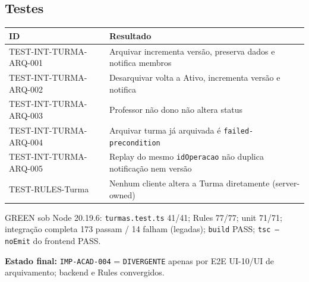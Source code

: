 \subsection{Testes}

\small
\begin{longtable}{@{}p{}p{}@{}}
\toprule
ID & Resultado \\
\midrule
\endhead
TEST-INT-TURMA-ARQ-001 & Arquivar incrementa versão, preserva dados e notifica membros \\
TEST-INT-TURMA-ARQ-002 & Desarquivar volta a Ativo, incrementa versão e notifica \\
TEST-INT-TURMA-ARQ-003 & Professor não dono não altera status \\
TEST-INT-TURMA-ARQ-004 & Arquivar turma já arquivada é \texttt{failed-precondition} \\
TEST-INT-TURMA-ARQ-005 & Replay do mesmo \texttt{idOperacao} não duplica notificação nem versão \\
TEST-RULES-Turma & Nenhum cliente altera a Turma diretamente (server-owned) \\
\bottomrule
\end{longtable}
\normalsize

GREEN sob Node 20.19.6: \texttt{turmas.test.ts} 41/41; Rules 77/77; unit
71/71; integração completa 173 passam / 14 falham (legadas); \texttt{build}
PASS; \texttt{tsc --noEmit} do frontend PASS.

\textbf{Estado final:} \texttt{IMP-ACAD-004} = \texttt{DIVERGENTE} apenas por
E2E UI-10/UI de arquivamento; backend e Rules convergidos.
